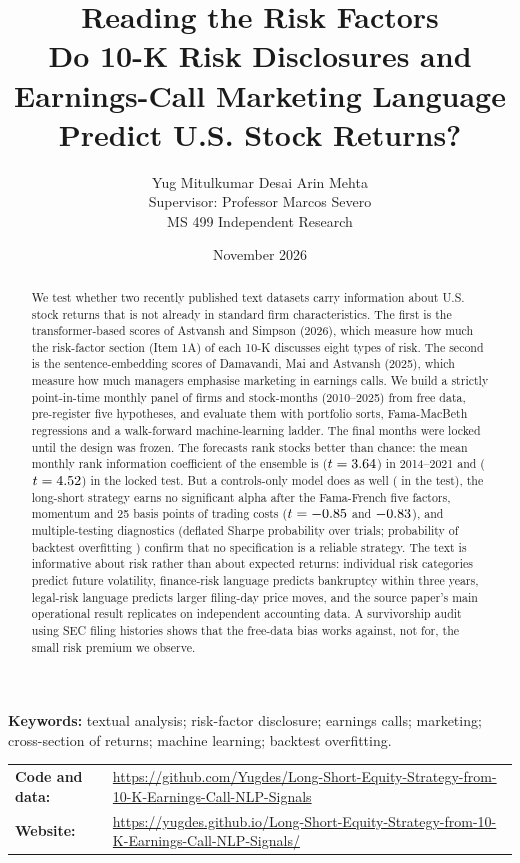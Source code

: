 \documentclass[11pt,a4paper]{article}
\title{\textbf{Reading the Risk Factors}\\[4pt]
\large Do 10-K Risk Disclosures and Earnings-Call Marketing Language\\ Predict U.S. Stock Returns?}
\author{Yug Mitulkumar Desai \qquad Arin Mehta\\[8pt]
{\normalsize Supervisor: Professor Marcos Severo}\\[2pt]
{\normalsize MS 499 Independent Research}}
\date{November 2026}
\begin{document}
\maketitle

\begin{abstract}
\noindent
We test whether two recently published text datasets carry information about U.S. stock returns that is not already in
standard firm characteristics. The first is the transformer-based scores of Astvansh and Simpson (2026), which measure
how much the risk-factor section (Item 1A) of each 10-K discusses eight types of risk. The second is the sentence-embedding
scores of Damavandi, Mai and Astvansh (2025), which measure how much managers emphasise marketing in earnings calls.
We build a strictly point-in-time monthly panel of \NFirmsPanel{} firms and \NStockMonths{} stock-months (2010--2025)
from free data, pre-register five hypotheses, and evaluate them with portfolio sorts, Fama-MacBeth regressions and a
walk-forward machine-learning ladder. The final \TestMonths{} months were locked until the design was frozen.
The forecasts rank stocks better than chance: the mean monthly rank information coefficient of the ensemble is
\DevIC{} ($t=3.64$) in 2014--2021 and \TestIC{} ($t=4.52$) in the locked test. But a controls-only model does as well
(\TestICControls{} in the test), the long-short strategy earns no significant alpha after the Fama-French five factors,
momentum and 25 basis points of trading costs ($t=-0.85$ and $-0.83$), and multiple-testing diagnostics
(deflated Sharpe probability \DSR{} over \DSRTrials{} trials; probability of backtest overfitting \PBO) confirm that no
specification is a reliable strategy. The text is informative about risk rather than about expected returns:
individual risk categories predict future volatility, finance-risk language predicts bankruptcy within three years,
legal-risk language predicts larger filing-day price moves, and the source paper's main operational result replicates
on independent accounting data. A survivorship audit using SEC filing histories shows that the free-data bias works
against, not for, the small risk premium we observe.
\end{abstract}

\vspace{4pt}
\noindent\textbf{Keywords:} textual analysis; risk-factor disclosure; earnings calls; marketing; cross-section of returns;
machine learning; backtest overfitting.

\vspace{6pt}
{\small\noindent\begin{tabularx}{\linewidth}{@{}l>{\raggedright\arraybackslash}X@{}}
\textbf{Code and data:} & \url{https://github.com/Yugdes/Long-Short-Equity-Strategy-from-10-K-Earnings-Call-NLP-Signals}\\
\textbf{Website:} & \url{https://yugdes.github.io/Long-Short-Equity-Strategy-from-10-K-Earnings-Call-NLP-Signals/}
\end{tabularx}}
\end{document}
